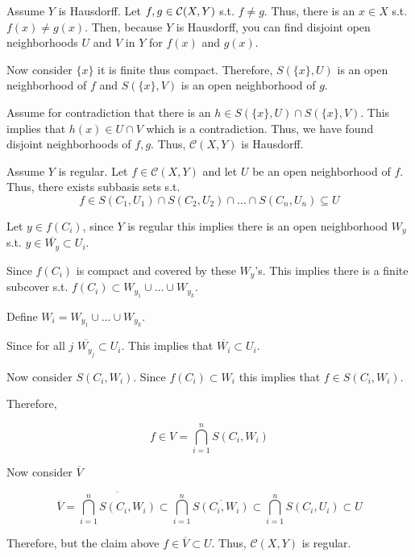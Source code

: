 \documentclass[12pt, letterpaper]{article}
\begin{document}
\begin{problemproof}
    Assume $Y$ is Hausdorff. Let $f,g \in \mathcal{C}(X,Y)$ s.t. $f \neq g$. Thus, there is an $x \in X$ s.t. $f(x) \neq g(x)$. Then, because $Y$ is Hausdorff, you can
    find disjoint open neighborhoods $U$ and $V$ in $Y$ for $f(x)$ and $g(x)$.

    Now consider $\{x\}$ it is finite thus compact. Therefore, $S(\{x\},U)$ is an open neighborhood of $f$ and $S(\{x\},V)$ is an open neighborhood of $g$.

    Assume for contradiction that there is an $h \in S(\{x\},U) \cap S(\{x\},V)$. This implies that $h(x) \in U \cap V$ which is a contradiction. Thus, we have found disjoint neighborhoods of $f,g$. Thus, $\mathcal{C}(X,Y)$ is Hausdorff.

    Assume $Y$ is regular. Let $f \in \mathcal{C}(X,Y)$ and let $U$ be an open neighborhood of $f$. Thus, there exists subbasis sets s.t.
    \[f \in S(C_1,U_1) \cap S(C_2,U_2) \cap \dots \cap S(C_n,U_n) \subseteq U\]

    Let $y \in f(C_i)$, since $Y$ is regular this implies there is an open neighborhood $W_y$ s.t. $y \in \overline{W_y} \subset U_i$.

    Since $f(C_i)$ is compact and covered by these $W_y$'s. This implies there is a finite subcover s.t. $f(C_i) \subset W_{y_1} \cup \dots \cup W_{y_k}$.

    Define $W_i=W_{y_1} \cup \dots \cup W_{y_k}$.

    Since for all $j$ $\overline{W_{y_j}} \subset U_i$. This implies that $\overline{W_i} \subset U_i$.

    Now consider $S(C_i,W_i)$. Since $f(C_i) \subset W_i$ this implies that $f \in S(C_i,W_i)$.

    Therefore,

    \[f \in V=\bigcap_{i =1}^n S(C_i,W_i)\]

    Now consider $\overline{V}$

    \[\overline{V}=\overline{\bigcap_{i =1}^n S(C_i,W_i)} \subset \bigcap_{i =1}^n \overline{S(C_i,W_i)} \subset \bigcap_{i =1}^nS(C_i,U_i) \subset U\]

    Therefore, but the claim above $f \in \overline{V} \subset U$. Thus, $\mathcal{C}(X,Y)$ is regular.
\end{problemproof}
\end{document}
